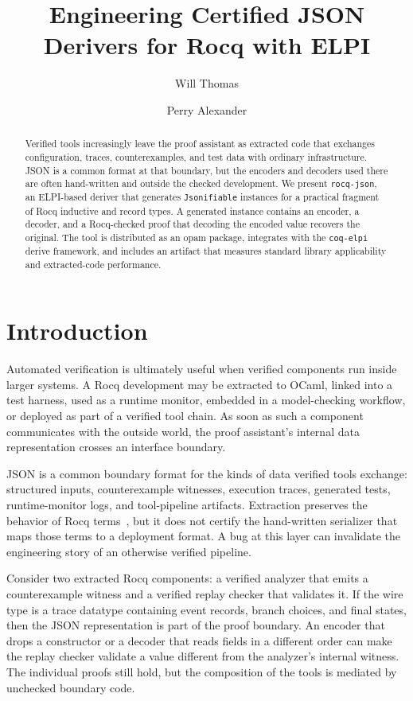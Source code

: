 \documentclass[runningheads]{llncs}
\title{Engineering Certified JSON Derivers for Rocq with ELPI}
\author{Will Thomas \and Perry Alexander}
\institute{University of Kansas, Lawrence, USA\\
\email{\{30wthomas, palexand\}@ku.edu}}
\newcommand{\coqelpi}{\texttt{coq-elpi}\xspace}
\begin{document}
\maketitle

\begin{abstract}
  Verified tools increasingly leave the proof assistant as extracted code that
  exchanges configuration, traces, counterexamples, and test data with ordinary
  infrastructure.  JSON is a common format at that boundary, but the encoders
  and decoders used there are often hand-written and outside the checked
  development.  We present \texttt{rocq-json}, an ELPI-based deriver that
  generates \texttt{Jsonifiable} instances for a practical fragment of Rocq
  inductive and record types.  A generated instance contains an encoder, a
  decoder, and a Rocq-checked proof that decoding the encoded value recovers the
  original.  The tool is distributed as an opam package, integrates with the
  \coqelpi derive framework, and includes an artifact that measures standard
  library applicability and extracted-code performance.
\end{abstract}

\section{Introduction}

Automated verification is ultimately useful when verified components run inside
larger systems.  A Rocq development may be extracted to OCaml, linked into a
test harness, used as a runtime monitor, embedded in a model-checking workflow,
or deployed as part of a verified tool chain.  As soon as such a component
communicates with the outside world, the proof assistant's internal data
representation crosses an interface boundary.

JSON is a common boundary format for the kinds of data verified tools exchange:
structured inputs, counterexample witnesses, execution traces, generated tests,
runtime-monitor logs, and tool-pipeline artifacts.  Extraction preserves the
behavior of Rocq terms~\cite{rocqDevs:2025:rocq_9.0.0}, but it does not certify
the hand-written serializer that maps those terms to a deployment format.  A
bug at this layer can invalidate the engineering story of an otherwise verified
pipeline.

Consider two extracted Rocq components: a verified analyzer that emits a
counterexample witness and a verified replay checker that validates it.  If the
wire type is a trace datatype containing event records, branch choices, and
final states, then the JSON representation is part of the proof boundary.  An
encoder that drops a constructor or a decoder that reads fields in a different
order can make the replay checker validate a value different from the analyzer's
internal witness.  The individual proofs still hold, but the composition of the
tools is mediated by unchecked boundary code.
\end{document}
